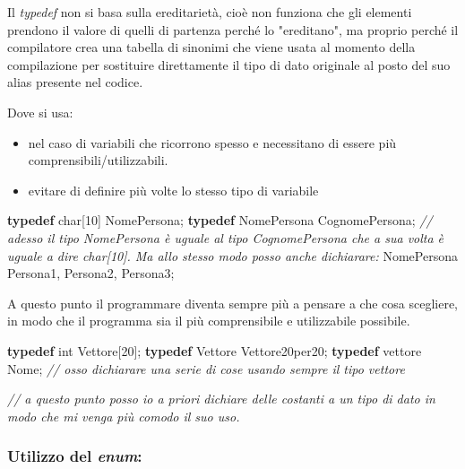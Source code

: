 \documentclass[
]{article}
\newenvironment{Shaded}{}{}
\newcommand{\CommentTok}[1]{\textcolor[rgb]{0.38,0.63,0.69}{\textit{#1}}}
\newcommand{\DataTypeTok}[1]{\textcolor[rgb]{0.56,0.13,0.00}{#1}}
\newcommand{\DecValTok}[1]{\textcolor[rgb]{0.25,0.63,0.44}{#1}}
\newcommand{\KeywordTok}[1]{\textcolor[rgb]{0.00,0.44,0.13}{\textbf{#1}}}
\newcommand{\NormalTok}[1]{#1}
\begin{document}
Il \emph{typedef} non si basa sulla ereditarietà, cioè non funziona che
gli elementi prendono il valore di quelli di partenza perché lo
"ereditano", ma proprio perché il compilatore crea una tabella di
sinonimi che viene usata al momento della compilazione per sostituire
direttamente il tipo di dato originale al posto del suo alias presente
nel codice.

Dove si usa:

\begin{itemize}
\item
  nel caso di variabili che ricorrono spesso e necessitano di essere più
  comprensibili/utilizzabili.
\item
  evitare di definire più volte lo stesso tipo di variabile
\end{itemize}

\begin{Shaded}
\begin{Highlighting}[]
\KeywordTok{typedef} \DataTypeTok{char}\NormalTok{[}\DecValTok{10}\NormalTok{] NomePersona;}
\KeywordTok{typedef}\NormalTok{ NomePersona CognomePersona;}
\CommentTok{// adesso il tipo NomePersona è uguale al tipo CognomePersona che a sua volta è uguale a dire char[10]. Ma allo stesso modo posso anche dichiarare:}
\NormalTok{NomePersona Persona1, Persona2, Persona3;}
\end{Highlighting}
\end{Shaded}

A questo punto il programmare diventa sempre più a pensare a che cosa
scegliere, in modo che il programma sia il più comprensibile e
utilizzabile possibile.

\begin{Shaded}
\begin{Highlighting}[]
\KeywordTok{typedef} \DataTypeTok{int}\NormalTok{ Vettore[}\DecValTok{20}\NormalTok{];}
\KeywordTok{typedef}\NormalTok{ Vettore Vettore20per20;}
\KeywordTok{typedef}\NormalTok{ vettore Nome;}
\CommentTok{// osso dichiarare una serie di cose usando sempre il tipo vettore}

\CommentTok{// a questo punto posso io a priori dichiare delle costanti a un tipo di dato in modo che mi venga più comodo il suo uso.}
\end{Highlighting}
\end{Shaded}

\hypertarget{header-n637}{%
\subsubsection{\texorpdfstring{Utilizzo del
\emph{enum}:}{Utilizzo del enum:}}\label{header-n637}}
\end{document}
